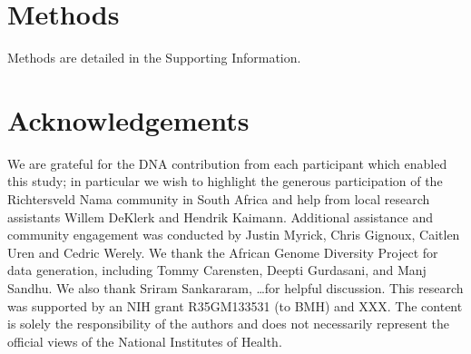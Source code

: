 \documentclass{article}
\begin{document}
\section*{Methods}

Methods are detailed in the Supporting Information.

\section*{Acknowledgements}

We are grateful for the DNA contribution from each participant which enabled
this study; in particular we wish to highlight the generous participation of
the Richtersveld Nama community in South Africa and help from local research
assistants Willem DeKlerk and Hendrik Kaimann. Additional assistance and
community engagement was conducted by Justin Myrick, Chris Gignoux, Caitlen
Uren and Cedric Werely. We thank the African Genome Diversity Project for data
generation, including Tommy Carensten, Deepti Gurdasani, and Manj Sandhu. We
also thank Sriram Sankararam, \dots for helpful discussion. This research was
supported by an NIH grant R35GM133531 (to BMH) and XXX. The content is solely
the responsibility of the authors and does not necessarily represent the
official views of the National Institutes of Health.

\break



\end{document}
